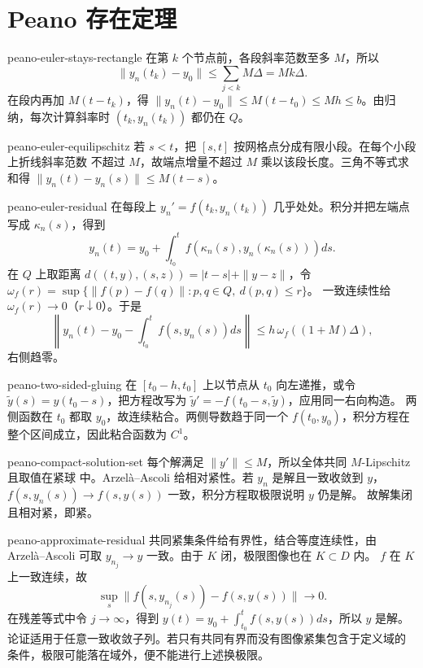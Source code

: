 \chapter{Peano 存在定理}

\begin{solution}{peano-euler-stays-rectangle}
在第 \(k\) 个节点前，各段斜率范数至多 \(M\)，所以
\[
 \|y_n(t_k)-y_0\|
 \le\sum_{j<k}M\Delta=Mk\Delta.
\]
在段内再加 \(M(t-t_k)\)，得
\(\|y_n(t)-y_0\|\le M(t-t_0)\le Mh\le b\)。由归纳，每次计算斜率时
\((t_k,y_n(t_k))\) 都仍在 \(Q\)。
\end{solution}

\begin{solution}{peano-euler-equilipschitz}
若 \(s<t\)，把 \([s,t]\) 按网格点分成有限小段。在每个小段上折线斜率范数
不超过 \(M\)，故端点增量不超过 \(M\) 乘以该段长度。三角不等式求和得
\(\|y_n(t)-y_n(s)\|\le M(t-s)\)。
\end{solution}

\begin{solution}{peano-euler-residual}
在每段上 \(y_n'=f(t_k,y_n(t_k))\) 几乎处处。积分并把左端点写成
\(\kappa_n(s)\)，得到
\[
 y_n(t)=y_0+\int_{t_0}^{t}f(\kappa_n(s),y_n(\kappa_n(s)))ds.
\]
在 \(Q\) 上取距离 \(d((t,y),(s,z))=|t-s|+\|y-z\|\)，令
\(\omega_f(r)=\sup\{\|f(p)-f(q)\|:p,q\in Q,\ d(p,q)\le r\}\)。
一致连续性给 \(\omega_f(r)\to0\)（\(r\downarrow0\)）。于是
\[
 \left\|y_n(t)-y_0-\int_{t_0}^{t}f(s,y_n(s))ds\right\|
 \le h\,\omega_f((1+M)\Delta),
\]
右侧趋零。
\end{solution}

\begin{solution}{peano-two-sided-gluing}
在 \([t_0-h,t_0]\) 上以节点从 \(t_0\) 向左递推，或令
\(\widetilde y(s)=y(t_0-s)\)，把方程改写为
\(\widetilde y'=-f(t_0-s,\widetilde y)\)，应用同一右向构造。
两侧函数在 \(t_0\) 都取 \(y_0\)，故连续粘合。两侧导数趋于同一个
\(f(t_0,y_0)\)，积分方程在整个区间成立，因此粘合函数为 \(C^1\)。
\end{solution}

\begin{solution}{peano-compact-solution-set}
每个解满足 \(\|y'\|\le M\)，所以全体共同 \(M\)-Lipschitz 且取值在紧球
中。Arzelà--Ascoli 给相对紧性。若 \(y_n\) 是解且一致收敛到 \(y\)，
\(f(s,y_n(s))\to f(s,y(s))\) 一致，积分方程取极限说明 \(y\) 仍是解。
故解集闭且相对紧，即紧。
\end{solution}

\begin{solution}{peano-approximate-residual}
共同紧集条件给有界性，结合等度连续性，由 Arzelà--Ascoli 可取
\(y_{n_j}\to y\) 一致。由于 \(K\) 闭，极限图像也在 \(K\subset D\) 内。
\(f\) 在 \(K\) 上一致连续，故
\[
 \sup_s\|f(s,y_{n_j}(s))-f(s,y(s))\|\to0.
\]
在残差等式中令 \(j\to\infty\)，得到
\(y(t)=y_0+\int_{t_0}^t f(s,y(s))ds\)，所以 \(y\) 是解。
论证适用于任意一致收敛子列。若只有共同有界而没有图像紧集包含于定义域的
条件，极限可能落在域外，便不能进行上述换极限。
\end{solution}

